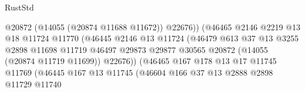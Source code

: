 \begin{lexlean}{RustStd}
\begin{coremodule}
                                              @20872
                                              (@14055 (@20874 @11688 @11672))
                                              @22676))
                                          (@46465
                                            @2146
                                            @2219
                                            @13
                                            @18
                                            @11724
                                            @11770
                                            (@46445
                                              @2146
                                              @13
                                              @11724
                                              (@46479
                                                @613
                                                @37
                                                @13
                                                @3255
                                                @2898
                                                @11698
                                                @11719
                                                @46497
                                                @29873
                                                @29877
                                                @30565
                                                @20872
                                                (@14055 (@20874 @11719 @11699))
                                                @22676))
                                            (@46465
                                              @167
                                              @178
                                              @13
                                              @17
                                              @11745
                                              @11769
                                              (@46445
                                                @167
                                                @13
                                                @11745
                                                (@46604
                                                  @166
                                                  @37
                                                  @13
                                                  @2888
                                                  @2898
                                                  @11729
                                                  @11740

\end{coremodule}
\end{lexlean}
